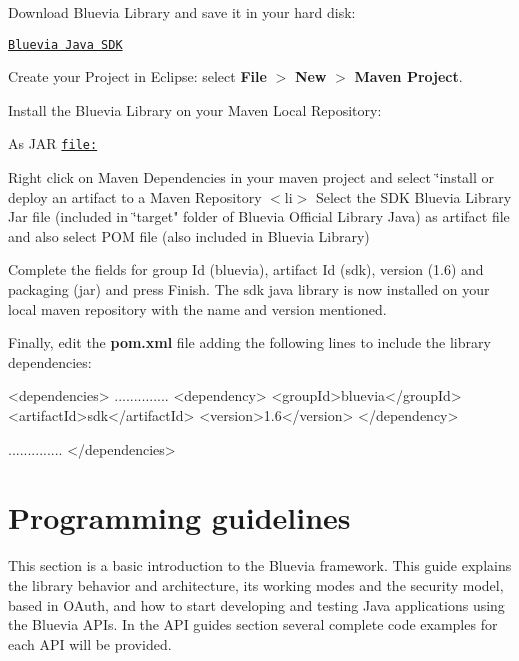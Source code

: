 \begin{DoxyEnumerate}
\item Download Bluevia Library and save it in your hard disk:

\href{http://bluevia.com/#}{\tt Bluevia Java SDK}


\item Create your Project in Eclipse: select {\bfseries File} $>$ {\bfseries New} $>$ {\bfseries Maven Project}.


\item Install the Bluevia Library on your Maven Local Repository: 
\begin{DoxyItemize}
\item As JAR \href{file:}{\tt file:} 
\begin{DoxyEnumerate}
\item Right click on Maven Dependencies in your maven project and select \char`\"{}install or deploy an artifact to a Maven Repository 
            $<$li$>$ Select the SDK Bluevia Library Jar file (included in \char`\"{}target" folder of Bluevia Official Library Java) as artifact file and also select POM file (also included in Bluevia Library) 
\item Complete the fields for group Id (bluevia), artifact Id (sdk), version (1.6) and packaging (jar) and press Finish. The sdk java library is now installed on your local maven repository with the name and version mentioned. 
\end{DoxyEnumerate}
\end{DoxyItemize}
\item Finally, edit the {\bfseries pom.xml} file adding the following lines to include the library dependencies:


\begin{DoxyCode}
                <dependencies>
                ..............
                <dependency>
                        <groupId>bluevia</groupId>
                        <artifactId>sdk</artifactId>
                        <version>1.6</version>
                </dependency>

                ..............
                </dependencies>
\end{DoxyCode}
  
\end{DoxyEnumerate}\hypertarget{main_programming_guidelines_sec}{}\section{Programming guidelines}\label{main_programming_guidelines_sec}
This section is a basic introduction to the Bluevia framework. This guide explains the library behavior and architecture, its working modes and the security model, based in OAuth, and how to start developing and testing Java applications using the Bluevia APIs. In the API guides section several complete code examples for each API will be provided.

